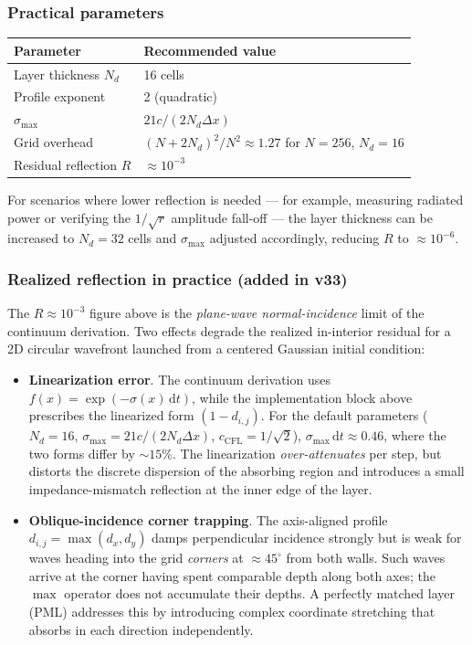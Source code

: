\documentclass[11pt,a4paper]{article}
\newcommand{\dd}{\mathrm{d}}
\begin{document}
\subsubsection*{Practical parameters}

\begin{center}
\begin{tabular}{@{}ll@{}}
\toprule
\textbf{Parameter} & \textbf{Recommended value} \\
\midrule
Layer thickness $N_d$ & 16 cells \\
Profile exponent & 2 (quadratic) \\
$\sigma_{\max}$ & $21c / (2 N_d \Delta x)$ \\
Grid overhead & $(N + 2N_d)^2 / N^2 \approx 1.27$ for $N=256$, $N_d=16$ \\
Residual reflection $R$ & $\approx 10^{-3}$ \\
\bottomrule
\end{tabular}
\end{center}

For scenarios where lower reflection is needed --- for example, measuring radiated power or verifying the $1/\sqrt{r}$ amplitude fall-off --- the layer thickness can be increased to $N_d = 32$ cells and $\sigma_{\max}$ adjusted accordingly, reducing $R$ to $\approx 10^{-6}$.

\subsubsection*{Realized reflection in practice (added in v33)}

The $R\approx10^{-3}$ figure above is the \emph{plane-wave normal-incidence} limit of the continuum derivation.  Two effects degrade the realized in-interior residual for a 2D circular wavefront launched from a centered Gaussian initial condition:

\begin{itemize}
  \item \textbf{Linearization error}.  The continuum derivation uses $f(x)=\exp(-\sigma(x)\,\dd t)$, while the implementation block above prescribes the linearized form $(1-d_{i,j})$.  For the default parameters ($N_d=16$, $\sigma_{\max}=21c/(2N_d\Delta x)$, $c_{\mathrm{CFL}}=1/\sqrt{2}$), $\sigma_{\max}\,\dd t \approx 0.46$, where the two forms differ by $\sim15\%$.  The linearization \emph{over-attenuates} per step, but distorts the discrete dispersion of the absorbing region and introduces a small impedance-mismatch reflection at the inner edge of the layer.
  \item \textbf{Oblique-incidence corner trapping}.  The axis-aligned profile $d_{i,j}=\max(d_x,d_y)$ damps perpendicular incidence strongly but is weak for waves heading into the grid \emph{corners} at $\approx45^\circ$ from both walls.  Such waves arrive at the corner having spent comparable depth along both axes; the $\max$ operator does not accumulate their depths.  A perfectly matched layer (PML) addresses this by introducing complex coordinate stretching that absorbs in each direction independently.
\end{itemize}
\end{document}
